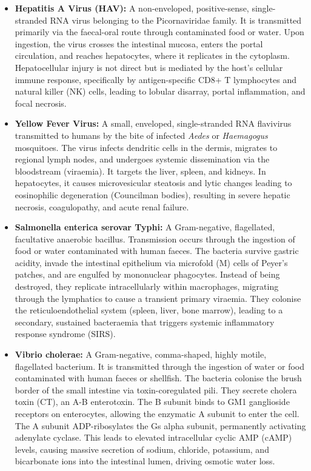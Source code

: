 \begin{itemize}
    \item \textbf{Hepatitis A Virus (HAV):} A non-enveloped, positive-sense, single-stranded RNA virus belonging to the Picornaviridae family. It is transmitted primarily via the faecal-oral route through contaminated food or water. Upon ingestion, the virus crosses the intestinal mucosa, enters the portal circulation, and reaches hepatocytes, where it replicates in the cytoplasm. Hepatocellular injury is not direct but is mediated by the host's cellular immune response, specifically by antigen-specific CD8+ T lymphocytes and natural killer (NK) cells, leading to lobular disarray, portal inflammation, and focal necrosis.
    \item \textbf{Yellow Fever Virus:} A small, enveloped, single-stranded RNA flavivirus transmitted to humans by the bite of infected \textit{Aedes} or \textit{Haemagogus} mosquitoes. The virus infects dendritic cells in the dermis, migrates to regional lymph nodes, and undergoes systemic dissemination via the bloodstream (viraemia). It targets the liver, spleen, and kidneys. In hepatocytes, it causes microvesicular steatosis and lytic changes leading to eosinophilic degeneration (Councilman bodies), resulting in severe hepatic necrosis, coagulopathy, and acute renal failure.
    \item \textbf{Salmonella enterica serovar Typhi:} A Gram-negative, flagellated, facultative anaerobic bacillus. Transmission occurs through the ingestion of food or water contaminated with human faeces. The bacteria survive gastric acidity, invade the intestinal epithelium via microfold (M) cells of Peyer's patches, and are engulfed by mononuclear phagocytes. Instead of being destroyed, they replicate intracellularly within macrophages, migrating through the lymphatics to cause a transient primary viraemia. They colonise the reticuloendothelial system (spleen, liver, bone marrow), leading to a secondary, sustained bacteraemia that triggers systemic inflammatory response syndrome (SIRS).
    \item \textbf{Vibrio cholerae:} A Gram-negative, comma-shaped, highly motile, flagellated bacterium. It is transmitted through the ingestion of water or food contaminated with human faeces or shellfish. The bacteria colonise the brush border of the small intestine via toxin-coregulated pili. They secrete cholera toxin (CT), an A-B enterotoxin. The B subunit binds to GM1 ganglioside receptors on enterocytes, allowing the enzymatic A subunit to enter the cell. The A subunit ADP-ribosylates the Gs alpha subunit, permanently activating adenylate cyclase. This leads to elevated intracellular cyclic AMP (cAMP) levels, causing massive secretion of sodium, chloride, potassium, and bicarbonate ions into the intestinal lumen, driving osmotic water loss.

\end{itemize}
